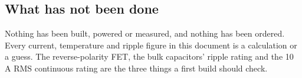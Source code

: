 \subsection*{What has not been done}

Nothing has been built, powered or measured, and nothing has been ordered. Every
current, temperature and ripple figure in this document is a calculation or a
guess. The reverse-polarity FET, the bulk capacitors' ripple rating and the
10 A RMS continuous rating are the three things a first build should check.
